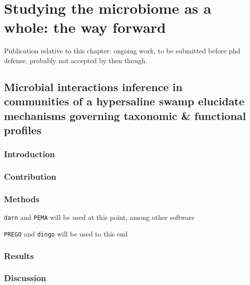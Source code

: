 % 
% 

\chapter{
    Studying the microbiome as a whole: the way forward
}
\label{cha:swamp}

Publication relative to this chapter: ongoing work, to be submitted before phd defense, probably not accepted by then though.


\section{
   Microbial interactions inference in communities of a hypersaline swamp elucidate mechanisms governing taxonomic \& functional profiles
}

\subsection{Introduction}



\subsection{Contribution}


\subsection{Methods}


   \texttt{darn} and \texttt{PEMA} will be used at this point, among other software 

   \texttt{PREGO} and \texttt{dingo} will be used to this end 



\subsection{Results}



\subsection{Discussion}







